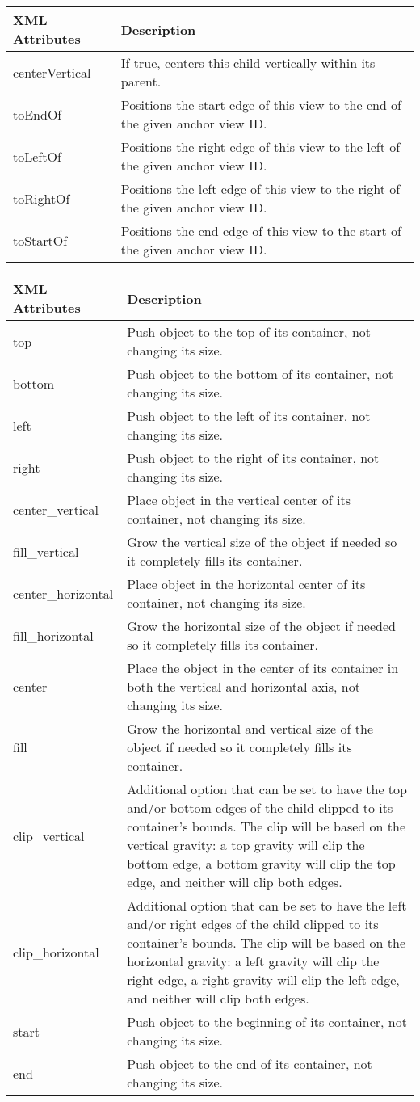 ﻿\documentclass[a4paper]{article}
\newenvironment{layoutparams}[1]{ %
  \begin{table*}[hptb]
  \ttfamily\centering
  \caption{#1}
  \vspace{1ex}
  \rowcolors{2}{green!20!red!20}{yellow!20}
  \begin{tabular}{p{14.5em}p{28em}}
    \rowcolor{cyan!60}
    XML Attributes & Description \\ %
    \hline
}{
  \end{tabular}
  \end{table*}
}
\begin{document}
\begin{layoutparams}{RelativeLayout.LayoutParams}
    centerVertical	&	If true, centers this child vertically within its parent.\\
    toEndOf	&	Positions the start edge of this view to the end of the given anchor view ID.\\
    toLeftOf	&	Positions the right edge of this view to the left of the given anchor view ID.\\
    toRightOf	&	Positions the left edge of this view to the right of the given anchor view ID.\\
    toStartOf	&	Positions the end edge of this view to the start of the given anchor view ID.\\
  \end{layoutparams}

  \begin{layoutparams}{android:layout\_gravity}
    top	&	 Push object to the top of its container, not changing its size. \\
    bottom	&	 Push object to the bottom of its container, not changing its size. \\
    left	&	 Push object to the left of its container, not changing its size. \\
    right	&	 Push object to the right of its container, not changing its size. \\
    center\_vertical	&	 Place object in the vertical center of its container, not changing its size. \\
    fill\_vertical	&	 Grow the vertical size of the object if needed so it completely fills its container. \\
    center\_horizontal	&	 Place object in the horizontal center of its container, not changing its size. \\
    fill\_horizontal	&	 Grow the horizontal size of the object if needed so it completely fills its container. \\
    center	&	 Place the object in the center of its container in both the vertical and horizontal axis, not changing its size. \\
    fill	&	 Grow the horizontal and vertical size of the object if needed so it completely fills its container. \\
    clip\_vertical	&	 Additional option that can be set to have the top and/or bottom edges of the child clipped to its container's bounds. The clip will be based on the vertical gravity: a top gravity will clip the bottom edge, a bottom gravity will clip the top edge, and neither will clip both edges. \\
    clip\_horizontal	&	 Additional option that can be set to have the left and/or right edges of the child clipped to its container's bounds. The clip will be based on the horizontal gravity: a left gravity will clip the right edge, a right gravity will clip the left edge, and neither will clip both edges. \\
    start	&	 Push object to the beginning of its container, not changing its size. \\
    end	&	 Push object to the end of its container, not changing its size. \\
  \end{layoutparams}
\end{document}
